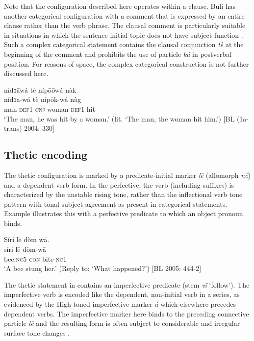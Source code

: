 \documentclass[output=paper]{langsci/langscibook}
\begin{document}
Note that the configuration described here operates within a clause. Buli has another categorical configuration with a comment that is expressed by an entire clause rather than the verb phrase. The clausal comment is particularly suitable in situations in which the sentence-initial topic does not have subject function . Such a complex categorical statement contains the clausal conjunction \textit{tè} at the beginning of the comment and prohibits the use of particle \textit{ká} in postverbal position. For reasons of space, the complex categorical construction is not further discussed here.

\ea\label{ex:schwarz:13}
\gll   nídɔ\={a}wá  tè  níp\={o}\={o}wá  nàk\\
  \textup{nídɔa-wá}  tè  níp\={o}k-wá  {nàg}\\
\glt man-\textsc{def}1  \textsc{cnj}  woman-\textsc{def}1  hit\\
‘The man, he was hit by a woman.’ (lit. ‘The man, the woman hit him.’) [BL (1a-trans) 2004: 330] 
\z

\subsection{Thetic encoding}\label{sec:schwarz:3.3}

The thetic configuration is marked by a predicate-initial marker \textit{l\={e}} (allomorph \textit{n\={e}}) and a dependent verb form. In the perfective, the verb (including suffixes) is characterized by the unstable rising tone, rather than the inflectional verb tone pattern with tonal subject agreement as present in categorical statements. Example  illustrates this with a perfective predicate to which an object pronoun binds.

\ea\label{ex:schwarz:14}
\glll   Sírí    l\={e}  dòm  w\={a}.\\
    \textup{síri}    l\={e}  {dòm-w\={a}}\\
       bee.\textsc{nc}5  \textsc{con}  bite-\textsc{nc}1\\
\glt ‘A bee stung her.’ (Reply to: ‘What happened?’) [BL  2005: 444-2]
\z

The thetic statement in  contains an imperfective predicate (stem \textit{v\={i}} ‘follow’). The imperfective verb is encoded like the dependent, non-initial verb in a series, as evidenced by the High-toned imperfective marker \textit{á} which elsewhere precedes dependent verbs. The imperfective marker here binds to the preceding connective particle \textit{l\={e}} and the resulting form is often subject to considerable and irregular surface tone changes \citep{Schwarz2007}.
\end{document}
